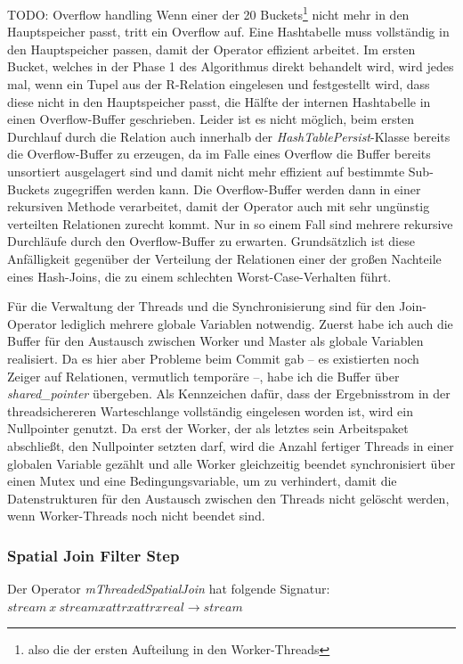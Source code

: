 \documentclass[a4paper,12pt,twoside]{article}
\newcommand{\Fb}[1]{\textit{#1}} %
\begin{document}
TODO: Overflow handling
Wenn einer der 20 Buckets\footnote{also die der ersten Aufteilung in den Worker-Threads} nicht mehr in den Hauptspeicher passt, tritt ein Overflow auf. Eine Hashtabelle muss vollständig in den Hauptspeicher passen, damit der Operator effizient arbeitet. Im ersten Bucket, welches in der Phase 1 des Algorithmus direkt behandelt wird, wird jedes mal, wenn ein Tupel aus der R-Relation eingelesen und festgestellt wird, dass diese nicht in den Hauptspeicher passt, die Hälfte der internen Hashtabelle in einen Overflow-Buffer geschrieben. Leider ist es nicht möglich, beim ersten Durchlauf durch die Relation auch innerhalb der \Fb{HashTablePersist}-Klasse bereits die Overflow-Buffer zu erzeugen, da im Falle eines Overflow die Buffer bereits unsortiert ausgelagert sind und damit nicht mehr effizient auf bestimmte Sub-Buckets zugegriffen werden kann. Die Overflow-Buffer werden dann in einer rekursiven Methode verarbeitet, damit der Operator auch mit sehr ungünstig verteilten Relationen zurecht kommt. Nur in so einem Fall sind mehrere rekursive Durchläufe durch den Overflow-Buffer zu erwarten. Grundsätzlich ist diese Anfälligkeit gegenüber der Verteilung der Relationen einer der großen Nachteile eines Hash-Joins, die zu einem schlechten Worst-Case-Verhalten führt.

Für die Verwaltung der Threads und die Synchronisierung sind für den Join-Operator lediglich mehrere globale Variablen notwendig. Zuerst habe ich auch die Buffer für den Austausch zwischen Worker und Master als globale Variablen realisiert. Da es hier aber Probleme beim Commit gab -- es existierten noch Zeiger auf Relationen, vermutlich temporäre --, habe ich die Buffer über \Fb{shared\_pointer} übergeben. Als Kennzeichen dafür, dass der Ergebnisstrom in der threadsichereren Warteschlange vollständig eingelesen worden ist, wird ein Nullpointer genutzt. Da erst der Worker, der als letztes sein Arbeitspaket abschließt, den Nullpointer setzten darf, wird die Anzahl fertiger Threads in einer globalen Variable gezählt und alle Worker gleichzeitig beendet synchronisiert über einen Mutex und eine Bedingungsvariable, um zu verhindert, damit die Datenstrukturen für den Austausch zwischen den Threads nicht gelöscht werden, wenn Worker-Threads noch nicht beendet sind.
 
\subsubsection{Spatial Join Filter Step}

Der Operator \Fb{mThreadedSpatialJoin} hat folgende Signatur: \newline
$stream~x~stream x attr x attr x real \longrightarrow stream$
\end{document}
